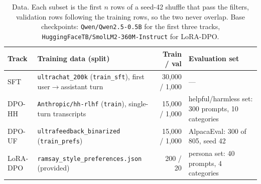 \begin{table}[!ht]
\centering
\footnotesize
\setlength{\tabcolsep}{4pt}
\begin{tabularx}{\linewidth}{@{}l>{\raggedright\arraybackslash}Xr>{\raggedright\arraybackslash}X@{}}
\toprule
Track & Training data (split) & Train / val & Evaluation set \\
\midrule
SFT & \texttt{ultrachat\_200k} (\texttt{train\_sft}), first user$\to$assistant turn & 30{,}000 / 1{,}000 & --- \\
DPO-HH & \texttt{Anthropic/hh-rlhf} (\texttt{train}), single-turn transcripts & 15{,}000 / 1{,}000 & helpful/harmless set: 300 prompts, 10 categories \\
DPO-UF & \texttt{ultrafeedback\_binarized} (\texttt{train\_prefs}) & 15{,}000 / 1{,}000 & AlpacaEval: 300 of 805, seed 42 \\
LoRA-DPO & \texttt{ramsay\_style\_preferences.json} (provided) & 200 / 20 & persona set: 40 prompts, 4 categories \\
\bottomrule
\end{tabularx}
\caption{Data. Each subset is the first $n$ rows of a seed-42 shuffle that pass the filters, validation rows following
the training rows, so the two never overlap. Base checkpoints: \texttt{Qwen/Qwen2.5-0.5B} \citep{qwen2024qwen25} for
the first three tracks, \texttt{HuggingFaceTB/SmolLM2-360M-Instruct} \citep{allal2025smollm2} for LoRA-DPO.}
\label{tab:data}
\end{table}
